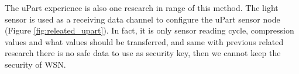 The uPart experience \cite{Beigl:2006:UEU:1127777.1127832} is also one research in range of this method. The light sensor is used as a receiving data channel to configure the uPart sensor node (Figure \ref{fig:releated_upart}). In fact, it is only sensor reading cycle, compression values and what values should be transferred, and same with previous related research there is no safe data to use as security key, then we cannot keep the security of WSN.

%
%
%
%
%
